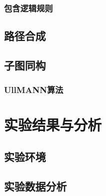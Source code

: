 \documentclass{XDBAthesis}
\begin{document}
\subsubsection{包含逻辑规则}
\subsection{路径合成}
\subsection{子图同构}
\subsubsection{UllMANN算法}

\section{实验结果与分析}
\subsection{实验环境}
\subsection{实验数据分析}


\ifx\allfiles\undefined


\end{document}

